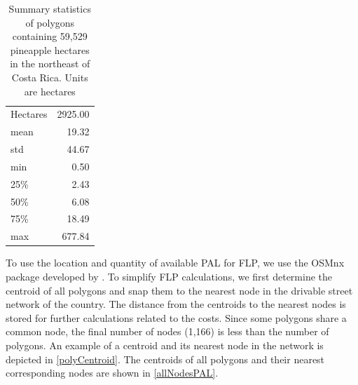 \begin{table}[!ht]
\centering 
\label{summaryPolyPAL}
\caption[Summary statistics of the pineapple field polygons]{Summary statistics of polygons containing 59,529 pineapple hectares in the northeast of Costa Rica. Units are hectares}
\begin{tabular}{lr} 
\hline \hline 
 Hectares & 2925.00 \\
 mean     & 19.32   \\
std      & 44.67   \\
min      & 0.50    \\
25\%     & 2.43    \\
50\%     & 6.08    \\
75\%     & 18.49   \\
max      & 677.84 \\
\hline   \hline   
\end{tabular}
\label{table:1}
\end{table}

To use the location and quantity of available PAL for FLP, we use the OSMnx package developed by \cite{boeing2017osmnx}. To simplify FLP calculations, we first determine the centroid of all polygons and snap them to the nearest node in the drivable street network of the country. The distance from the centroids to the nearest nodes is stored for further calculations related to the costs. Since some polygons share a common node, the final number of nodes (1,166) is less than the number of polygons. An example of a centroid and its nearest node in the network is depicted in \cref{polyCentroid}. The centroids of all polygons and their nearest corresponding nodes are shown in \cref{allNodesPAL}. 


